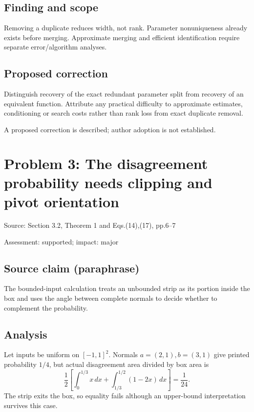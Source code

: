 \documentclass[11pt]{article}
\begin{document}
\subsection*{Finding and scope}

Removing a duplicate reduces width, not rank. Parameter nonuniqueness already exists before merging. Approximate merging and efficient identification require separate error/algorithm analyses.

\subsection*{Proposed correction}

Distinguish recovery of the exact redundant parameter split from recovery of an equivalent function. Attribute any practical difficulty to approximate estimates, conditioning or search costs rather than rank loss from exact duplicate removal.

A proposed correction is described; author adoption is not established.

\section*{Problem 3: The disagreement probability needs clipping and pivot orientation}

Source: Section 3.2, Theorem 1 and Eqs.(14),(17), pp.6–7

Assessment: supported; impact: major

\subsection*{Source claim (paraphrase)}

The bounded-input calculation treats an unbounded strip as its portion inside the box and uses the angle between complete normals to decide whether to complement the probability.

\subsection*{Analysis}

Let inputs be uniform on \([-1,1]^2\). Normals \(a=(2,1),b=(3,1)\) give printed probability \(1/4\), but actual disagreement area divided by box area is \[\frac12\left[\int_0^{1/3}x\,dx+\int_{1/3}^{1/2}(1-2x)\,dx\right]=\frac1{24}.\] The strip exits the box, so equality fails although an upper-bound interpretation survives this case.
\end{document}
